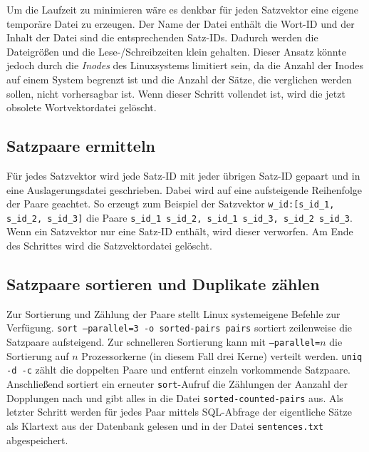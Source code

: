\documentclass[a4paper,11pt,utf8]{scrartcl}
\begin{document}
Um die Laufzeit zu minimieren wäre es denkbar für jeden Satzvektor eine eigene temporäre Datei zu erzeugen. Der Name der Datei enthält die Wort-ID und der Inhalt der Datei sind die entsprechenden Satz-IDs. Dadurch werden die Dateigrößen und die Lese-/Schreibzeiten klein gehalten. Dieser Ansatz könnte jedoch durch die \emph{Inodes} des Linuxsystems limitiert sein, da die Anzahl der Inodes auf einem System begrenzt ist und die Anzahl der Sätze, die verglichen werden sollen, nicht vorhersagbar ist. Wenn dieser Schritt vollendet ist, wird die jetzt obsolete Wortvektordatei gelöscht.

\subsection{Satzpaare ermitteln}
Für jedes Satzvektor wird jede Satz-ID mit jeder übrigen Satz-ID gepaart und in eine Auslagerungsdatei geschrieben. Dabei wird auf eine aufsteigende Reihenfolge der Paare geachtet. So erzeugt zum Beispiel der Satzvektor \texttt{w\_id:[s\_id\_1, s\_id\_2, s\_id\_3]} die Paare \texttt{s\_id\_1 s\_id\_2, s\_id\_1 s\_id\_3, s\_id\_2 s\_id\_3}. Wenn ein Satzvektor nur eine Satz-ID enthält, wird dieser verworfen. Am Ende des Schrittes wird die Satzvektordatei gelöscht.

\subsection{Satzpaare sortieren und Duplikate zählen}
Zur Sortierung und Zählung der Paare stellt Linux systemeigene Befehle zur Verfügung. \texttt{sort --parallel=3 -o sorted-pairs pairs} sortiert zeilenweise die Satzpaare aufsteigend. Zur schnelleren Sortierung kann mit \texttt{--parallel=$n$} die Sortierung auf $n$ Prozessorkerne (in diesem Fall drei Kerne) verteilt werden. \texttt{uniq -d -c} zählt die doppelten Paare und entfernt einzeln vorkommende Satzpaare. Anschließend sortiert ein erneuter \texttt{sort}-Aufruf die Zählungen der Aanzahl der Dopplungen nach und gibt alles in die Datei \texttt{sorted-counted-pairs} aus. Als letzter Schritt werden für jedes Paar mittels SQL-Abfrage der eigentliche Sätze als Klartext aus der Datenbank gelesen und in der Datei \texttt{sentences.txt} abgespeichert.
\end{document}
